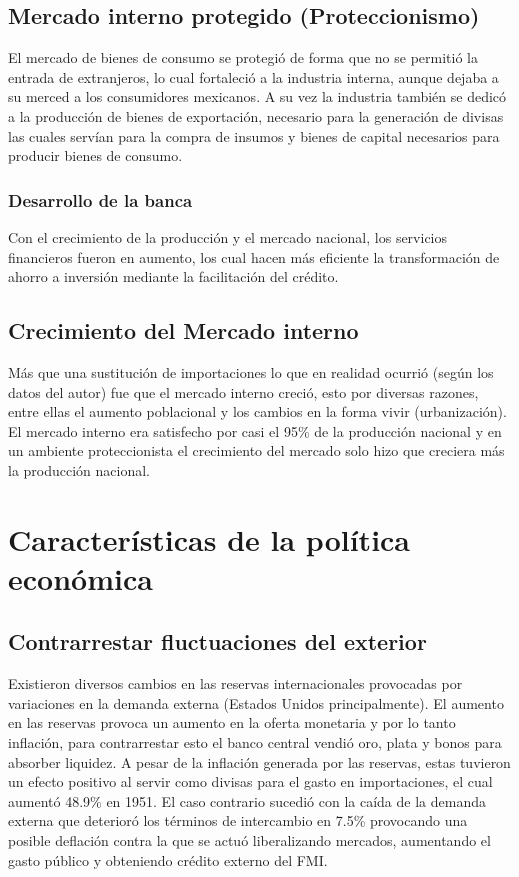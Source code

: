 \subsection{Mercado interno protegido (Proteccionismo)}
El mercado de bienes de consumo se protegió de forma que no se permitió la entrada de extranjeros, lo cual fortaleció a la industria interna, aunque dejaba a su merced a los consumidores mexicanos. A su vez la industria también se dedicó a la producción de bienes de exportación, necesario para la generación de divisas las cuales servían para la compra de insumos y bienes de capital necesarios para producir bienes de consumo. 

\subsubsection{Desarrollo de la banca}
Con el crecimiento de la producción y el mercado nacional, los servicios financieros fueron en aumento, los cual hacen más eficiente la transformación de ahorro a inversión mediante la facilitación del crédito.

\subsection{Crecimiento del Mercado interno}
Más que una sustitución de importaciones lo que en realidad ocurrió (según los datos del autor) fue que el mercado interno creció, esto por diversas razones, entre ellas el aumento poblacional y los cambios en la forma vivir (urbanización). El mercado interno era satisfecho por casi el 95\% de la producción nacional y en un ambiente proteccionista el crecimiento del mercado solo hizo que creciera más la producción nacional.

\section{Características de la política económica}
\subsection{Contrarrestar fluctuaciones del exterior}
Existieron diversos cambios en las reservas internacionales provocadas por variaciones en la demanda externa (Estados Unidos principalmente). El aumento en las reservas provoca un aumento en la oferta monetaria y por lo tanto inflación, para contrarrestar esto el banco central vendió oro, plata y bonos para absorber liquidez. A pesar de la inflación generada por las reservas, estas tuvieron un efecto positivo al servir como divisas para el gasto en importaciones, el cual aumentó 48.9\% en 1951.
El caso contrario sucedió con la caída de la demanda externa que deterioró los términos de intercambio en 7.5\% provocando una posible deflación contra la que se actuó liberalizando mercados, aumentando el gasto público y obteniendo crédito externo del FMI.
